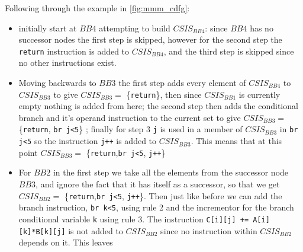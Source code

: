 Following through the example in \ref{fig:mmm_cdfg}:
\begin{itemize}
\item initially start at $BB4$ attempting to build $CSIS_{BB4}$:
since $BB4$ has no successor nodes the first step is skipped, however for the second step the \lstinline{return}
instruction is added to $CSIS_{BB4}$, and the third step is skipped since no other instructions exist.

\item Moving backwards to $BB3$ the first step adds every element of $CSIS_{BB4}$ to $CSIS_{BB3}$ to give 
$CSIS_{BB3}=$ \{\lstinline{return}\}, then since $CSIS_{BB1}$ is currently empty nothing is added from here; the second step then adds the conditional branch and it's operand
instruction to the current set to give $CSIS_{BB3}= $\{\lstinline{return}, \lstinline{br j<5}\} ;
finally for step 3 \lstinline{j} is used in a member of $CSIS_{BB3}$ in \lstinline{br j<5} so the instruction
\lstinline{j++} is added to $CSIS_{BB3}$. This means that at this point $CSIS_{BB3} =$
\{\lstinline{return},\lstinline{br j<5}, \lstinline{j++}\}

\item For $BB2$ in the first step we take all the elements from the successor node $BB3$, and ignore the fact
that it has itself as a successor, so that we get $CSIS_{BB2} =$ \{\lstinline{return},\lstinline{br j<5}, \lstinline{j++}\}.
Then just like before we can add the branch instruction, \lstinline{br k<5}, using rule 2 and the incrementor for the branch
conditional variable \lstinline{k} using rule 3. 
The instruction \lstinline{C[i][j] += A[i][k]*B[k][j]} is not added to $CSIS_{BB2}$ since no instruction
within $CSIS_{BB2}$ depends on it. This leaves 

\end{itemize}

